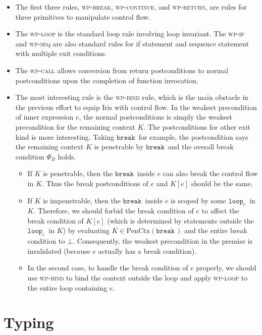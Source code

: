 \documentclass{article}
\numberwithin{algorithm}{section}
\newcommand{\cmdloop}[1]{\texttt{loop}_{#1}\,}
\newcommand{\cmdbreak}{\texttt{break}\,}
\newcommand{\pure}[1]{\text{PenCtx}(#1)}
\begin{document}
\begin{itemize}
    \item The first three rules, \textsc{wp-break}, \textsc{wp-continue}, and \textsc{wp-return}, are rules for three primitives to manipulate control flow.
    \item The \textsc{wp-loop} is the standard loop rule involving loop invariant.
    The \textsc{wp-if} and \textsc{wp-seq} are also standard rules for if statement and sequence statement with multiple exit conditions.
    \item The \textsc{wp-call} allows conversion from return postconditions to normal postconditions upon the completion of function invocation.
    \item The most interesting rule is the \textsc{wp-bind} rule, which is the main obstacle in the previous effort to equip Iris with control flow.
    In the weakest precondition of inner expression $e$, the normal postconditions is simply the weakest precondition for the remaining context $K$.
    The postconditions for other exit kind is more interesting. Taking $\cmdbreak\!$ for example, the postcondition says the remaining context $K$ is penetrable by $\cmdbreak\!$ and the overall break condition $\Phi_B$ holds. \begin{itemize}
        \item If $K$ is penetrable, then the $\cmdbreak\!$ inside $e$ can also break the control flow in $K$. Thus the break postconditions of $e$ and $K[e]$ should be the same.
        \item If $K$ is impenetrable, then the $\cmdbreak\!$ inside $e$ is scoped by some $\cmdloop{e}\!$ in $K$. Therefore, we should forbid the break condition of $e$ to affect the break condition of $K[e]$ (which is determined by statements outside the $\cmdloop{e}\!$ in $K$) by evaluating $K \in \pure{\cmdbreak\!}$ and the entire break condition to $\bot$.
        Consequently, the weakest precondition in the premise is invalidated (because $e$ actually has a break condition).
        \item In the second case, to handle the break condition of $e$ properly, we should use \textsc{wp-bind} to bind the context outside the loop and apply \textsc{wp-loop} to the entire loop containing $e$.
    \end{itemize}
\end{itemize}


\section{Typing}
\end{document}
